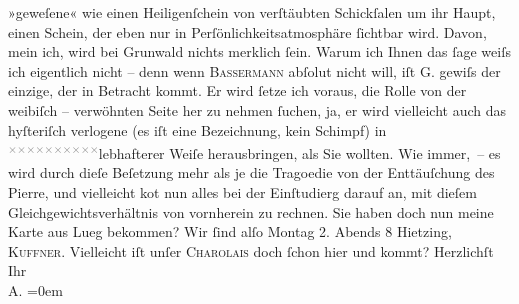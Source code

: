 \begin{ledgroupsized}[t]{13cm}
               »geweſene« wie einen Heiligenſchein von verſtäubten Schickſalen um ihr Haupt, einen
               Schein, der eben nur in Perſönlichkeitsatmosphäre ſichtbar {\pb}wird. Davon, mein ich, wird bei Grunwald nichts merklich ſein. Warum ich Ihnen das ſage weiſs
               ich eigentlich nicht – denn wenn \textsc{Bassermann} abſolut nicht will, iſt G. gewiſs der
               einzige, der in Betracht kommt. Er wird ſetze ich voraus, die Rolle von der weibiſch
                   – verwöhnten Seite her zu nehmen ſuchen,  ja, er wird vielleicht auch das hyſteriſch
               verlogene (es iſt eine Bezeichnung, kein Schimpf) in \substVorne{}\textsuperscript{\textcolor{gray}{×}\-\textcolor{gray}{×}\-\textcolor{gray}{×}\-\textcolor{gray}{×}\-\textcolor{gray}{×}\-\textcolor{gray}{×}\-\textcolor{gray}{×}\-\textcolor{gray}{×}\-\textcolor{gray}{×}\-\textcolor{gray}{×}}\substDazwischen{}lebhafterer\substHinten{} Weiſe herausbringen, als Sie wollten. Wie immer, – es {\pb}wird durch dieſe Beſetzung  mehr als je die Tragoedie von der Enttäuſchung des Pierre, und vielleicht ko{\geminationm}t nun alles bei der Einſtudierg darauf an, mit dieſem
               Gleichgewichtsverhältnis von vornherein zu rechnen.\pend
           \pstart
           Sie haben doch nun meine Karte aus Lueg bekommen?
               Wir ſind alſo Montag 2.{ }Abends 8{ }Hietzing, \textsc{Kuffner}. Vielleicht iſt unſer \textsc{Charolais} doch ſchon hier und kommt?\pend
           \pstart
           Herzlichſt Ihr{\\[\baselineskip]}\spacefill\mbox{A.}\pend
           \leftskip=0em{}
         
         \endnumbering{}\end{ledgroupsized}  \newcommand{\dateiname}{L01488}\newcommand{\titel}{Arthur Schnitzler an Hugo von Hofmannsthal, 31. 12. 1904}\newcommand{\editorInnen}{Martin Anton Müller und Gerd-Hermann Susen}
      
